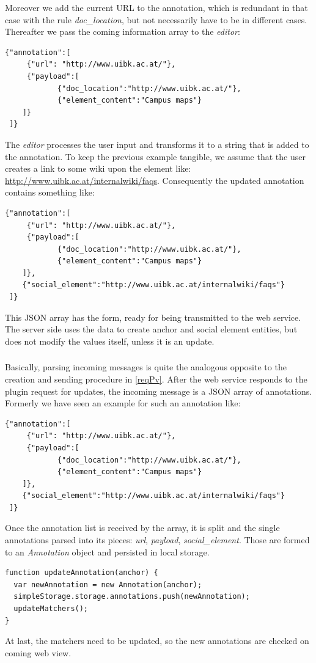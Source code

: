 Moreover we add the current URL to the annotation, which is redundant in that case with the rule \textit{doc\_location}, but not necessarily have to be in different cases. Thereafter we pass the coming information array to the \textit{editor}:
\begin{lstlisting}
{"annotation":[
	 {"url": "http://www.uibk.ac.at/"},
	 {"payload":[
 			{"doc_location":"http://www.uibk.ac.at/"},
 			{"element_content":"Campus maps"}
 	]}
 ]}
\end{lstlisting}

The \textit{editor} processes the user input and transforms it to a string that is added to the annotation. To keep the previous example tangible, we assume that the user creates a link to some wiki upon the element like: \url{http://www.uibk.ac.at/internalwiki/faqs}. 
Consequently the updated annotation contains something like:
\begin{lstlisting}
{"annotation":[
	 {"url": "http://www.uibk.ac.at/"},
	 {"payload":[
 			{"doc_location":"http://www.uibk.ac.at/"},
 			{"element_content":"Campus maps"}
 	]},
 	{"social_element":"http://www.uibk.ac.at/internalwiki/faqs"}
 ]}
\end{lstlisting}

This JSON array has the form, ready for being transmitted to the web service. The server side uses the data to create anchor and social element entities, but does not modify the values itself, unless it is an update. 

\subsubsection[Parsing Incoming Messages]{\reqPvi}\label{reqPvi}
Basically, parsing incoming messages is quite the analogous opposite to the creation and sending procedure in \ref{reqPv}. After the web service responds to the plugin request for updates, the incoming message is a JSON array of annotations. Formerly we have seen an example for such an annotation like:
\begin{lstlisting}
{"annotation":[
	 {"url": "http://www.uibk.ac.at/"},
	 {"payload":[
 			{"doc_location":"http://www.uibk.ac.at/"},
 			{"element_content":"Campus maps"}
 	]},
 	{"social_element":"http://www.uibk.ac.at/internalwiki/faqs"}
 ]}
\end{lstlisting}
Once the annotation list is received by the array, it is split and the single annotations parsed into its pieces: \textit{url}, \textit{payload}, \textit{social\_element}. Those are formed to an \textit{Annotation} object and persisted in local storage. 
\begin{lstlisting}
function updateAnnotation(anchor) {
  var newAnnotation = new Annotation(anchor);  
  simpleStorage.storage.annotations.push(newAnnotation);
  updateMatchers();
}
\end{lstlisting}
At last, the matchers need to be updated, so the new annotations are checked on coming web view. 

